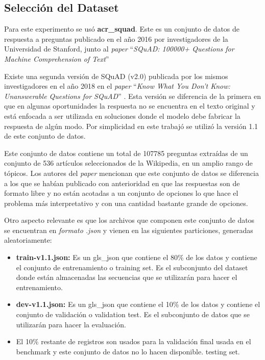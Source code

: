 
\subsection{Selección del Dataset}
\label{subsection-qa-dataset-imdb}

Para este experimento se usó \textbf{\acrfull{acr_squad}}. Este es un conjunto de datos de respuesta a preguntas publicado en el año 2016 por investigadores de la Universidad de Stanford, junto al \textit{paper} ``\textit{SQuAD: 100000+ Questions for Machine Comprehension of Text}'' \citep{SQUADv1_https://doi.org/10.48550/arxiv.1606.05250}

Existe una segunda versión de SQuAD (v2.0) publicada por los mismos investigadores en el año 2018 en el \textit{paper} ``\textit{Know What You Don't Know: Unanswerable Questions for SQuAD}'' \citep{SQUADv2_https://doi.org/10.48550/arxiv.1806.03822}. Esta versión se diferencia de la primera en que en algunas oportunidades la respuesta no se encuentra en el texto original y está enfocada a ser utilizada en soluciones donde el modelo debe fabricar la respuesta de algún modo. Por simplicidad en este trabajó se utilizó la versión 1.1 de este conjunto de datos.

Este conjunto de datos contiene un total de 107785 preguntas extraídas de un conjunto de 536 artículos seleccionados de la Wikipedia, en un amplio rango de tópicos. Los autores del \textit{paper} mencionan que este conjunto de datos se diferencia a los que se habían publicado con anterioridad en que las respuestas son de formato libre y no están acotadas a un conjunto de opciones lo que hace el problema más interpretativo y con una cantidad bastante grande de opciones. 

Otro aspecto relevante es que los archivos que componen este conjunto de datos se encuentran en \textit{formato .json} y vienen en las siguientes particiones, generadas aleatoriamente:

\begin{itemize}
    \item \textbf{train-v1.1.json:} Es un \gls{gls_json} que contiene el 80\% de los datos y contiene el conjunto de entrenamiento o training set. Es el subconjunto del dataset donde están almacenadas las secuencias que se utilizarán para hacer el entrenamiento.
    \item \textbf{dev-v1.1.json:} Es un \gls{gls_json} que contiene el 10\% de los datos y contiene el conjunto de validación o validation test. Es el subconjunto de datos que se utilizarán para hacer la evaluación.
    \item El 10\% restante de registros son usados para la validación final usada en el benchmark y este conjunto de datos no lo hacen disponible. testing set.
\end{itemize}

